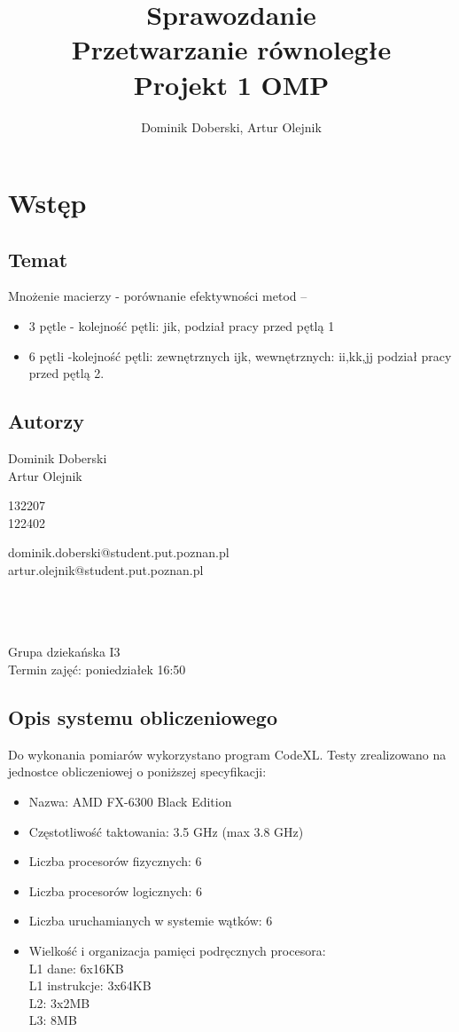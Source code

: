 \documentclass{article}
\author{Dominik Doberski, Artur Olejnik}
\title{
\huge Sprawozdanie 
\\Przetwarzanie równoległe\\
\Huge Projekt 1 OMP}
\begin{document}
\maketitle

\section{Wstęp}
\subsection{Temat}
Mnożenie macierzy - porównanie efektywności metod --
\begin{itemize}
\item 3 pętle - kolejność pętli: jik, podział pracy przed pętlą 1
\item 6 pętli -kolejność pętli: zewnętrznych ijk, wewnętrznych: ii,kk,jj podział pracy przed pętlą 2.
\end{itemize}
\subsection{Autorzy}
\begin{minipage}[t]{0.3\textwidth}
Dominik Doberski\\
Artur Olejnik
\end{minipage}
\begin{minipage}[t]{0.15\textwidth}
132207\\
122402
\end{minipage}
\begin{minipage}[t]{0.55\textwidth}
dominik.doberski@student.put.poznan.pl\\
artur.olejnik@student.put.poznan.pl
\end{minipage}
\\\\\\
Grupa dziekańska I3\\
Termin zajęć: poniedziałek 16:50 
\subsection{Opis systemu obliczeniowego}
Do wykonania pomiarów wykorzystano program CodeXL. Testy zrealizowano na jednostce obliczeniowej o poniższej specyfikacji:
\begin{itemize}
\item Nazwa: AMD FX-6300 Black Edition
\item Częstotliwość taktowania: 3.5 GHz (max 3.8 GHz)
\item Liczba procesorów fizycznych: 6
\item Liczba procesorów logicznych: 6
\item Liczba uruchamianych w systemie wątków: 6
\item Wielkość i organizacja pamięci podręcznych procesora:\\
L1 dane: 6x16KB\\
L1 instrukcje: 3x64KB\\
L2: 3x2MB\\
L3: 8MB\\
\end{itemize}
\end{document}
